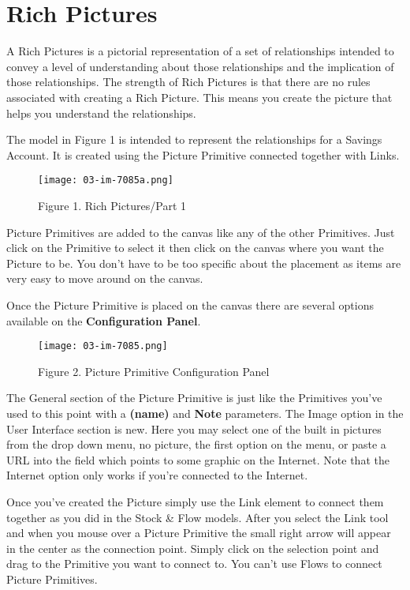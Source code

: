 \documentclass[]{memoir}
\makeatletter
\def\maxwidth{\ifdim\Gin@nat@width>\linewidth\linewidth
\else\Gin@nat@width\fi}
\let\Oldincludegraphics\includegraphics
\renewcommand{\includegraphics}[1]{\Oldincludegraphics[width=\maxwidth]{#1}}
\renewcommand{\u}[1]{\textbf{#1}}
\renewcommand{\a}[1]{\textbf{#1}}
\makeatother
\begin{document}
\section{Rich Pictures}

A Rich Pictures is a pictorial representation of a set of relationships
intended to convey a level of understanding about those relationships
and the implication of those relationships. The strength of Rich
Pictures is that there are no rules associated with creating a Rich
Picture. This means you create the picture that helps you understand the
relationships.

The model in Figure 1 is intended to represent the relationships for a
Savings Account. It is created using the Picture Primitive connected
together with Links.

\begin{figure}[htbp]
\centering
\texttt{[image: 03-im-7085a.png]}
\caption{Figure 1. Rich Pictures/Part 1}
\end{figure}

Picture Primitives are added to the canvas like any of the other
Primitives. Just click on the Primitive to select it then click on the
canvas where you want the Picture to be. You don't have to be too
specific about the placement as items are very easy to move around on
the canvas.

Once the Picture Primitive is placed on the canvas there are several
options available on the \u{Configuration Panel}.

\begin{figure}[htbp]
\centering
\texttt{[image: 03-im-7085.png]}
\caption{Figure 2. Picture Primitive Configuration Panel}
\end{figure}

The General section of the Picture Primitive is just like the Primitives
you've used to this point with a \a{(name)} and \a{Note} parameters. The
Image option in the User Interface section is new. Here you may select
one of the built in pictures from the drop down menu, no picture, the
first option on the menu, or paste a URL into the field which points to
some graphic on the Internet. Note that the Internet option only works
if you're connected to the Internet.

Once you've created the Picture simply use the Link element to connect
them together as you did in the Stock \& Flow models. After you select
the Link tool and when you mouse over a Picture Primitive the small
right arrow will appear in the center as the connection point. Simply
click on the selection point and drag to the Primitive you want to
connect to. You can't use Flows to connect Picture Primitives.
\end{document}
